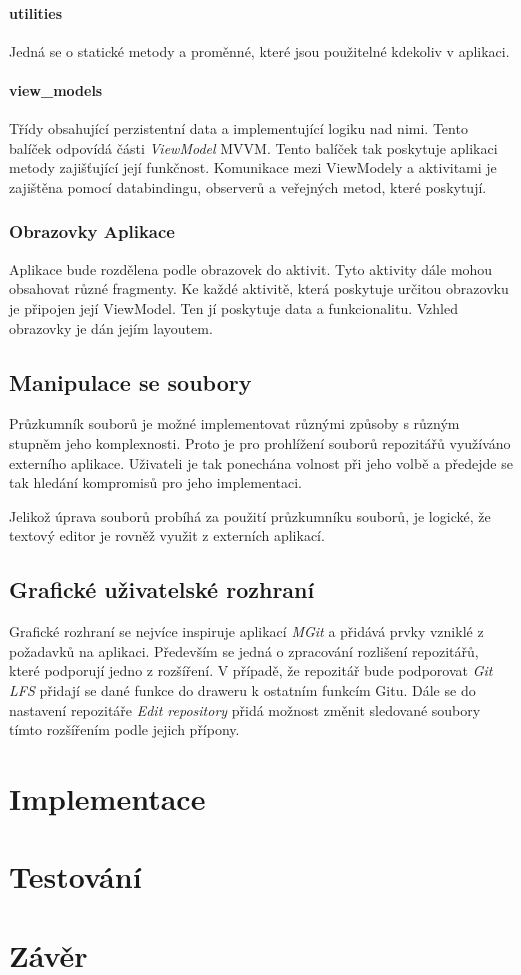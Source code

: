            \subsubsection{utilities}
            Jedná se o statické metody a proměnné, které jsou použitelné kdekoliv v aplikaci. 

            \subsubsection{view\_models}
            Třídy obsahující perzistentní data a implementující logiku nad nimi. Tento balíček odpovídá části \emph{ViewModel} MVVM. Tento balíček tak poskytuje aplikaci metody zajišťující její funkčnost. Komunikace mezi ViewModely a aktivitami je zajištěna pomocí databindingu, observerů a veřejných metod, které poskytují.

        \subsection{Obrazovky Aplikace}
        Aplikace bude rozdělena podle obrazovek do aktivit. Tyto aktivity dále mohou obsahovat různé fragmenty. Ke každé aktivitě, která poskytuje určitou obrazovku je připojen její ViewModel. Ten jí poskytuje data a funkcionalitu. Vzhled obrazovky je dán jejím layoutem.

    \section{Manipulace se soubory}
    Průzkumník souborů je možné implementovat různými způsoby s různým stupněm jeho komplexnosti. Proto je pro prohlížení souborů repozitářů využíváno externího aplikace. Uživateli je tak ponechána volnost při jeho volbě a předejde se tak hledání kompromisů pro jeho implementaci.

    Jelikož úprava souborů probíhá za použití průzkumníku souborů, je logické, že textový editor je rovněž využit z externích aplikací.

    \section{Grafické uživatelské rozhraní}
    Grafické rozhraní se nejvíce inspiruje aplikací \emph{MGit} a přidává prvky vzniklé z požadavků na aplikaci. Především se jedná o zpracování rozlišení repozitářů, které podporují jedno z rozšíření. V případě, že repozitář bude podporovat \emph{Git LFS} přidají se dané funkce do draweru k ostatním funkcím Gitu. Dále se do nastavení repozitáře \emph{Edit repository} přidá možnost změnit sledované soubory tímto rozšířením podle jejich přípony.

\chapter{Implementace}

\chapter{Testování}
\chapter{Závěr}